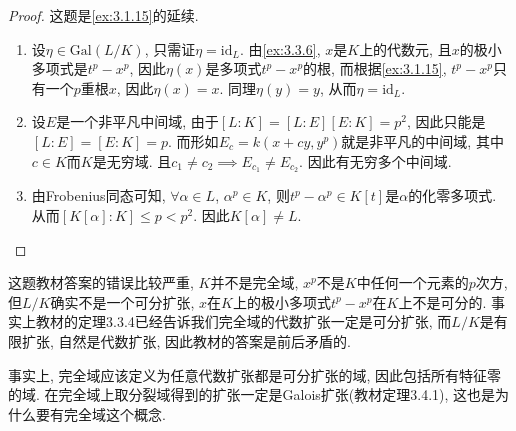 \begin{proof}
    这题是\ref{ex:3.1.15}的延续.
    \begin{enumerate}[(1)]
        \item 设$\eta \in \mathrm{Gal}(L/K)$, 只需证$\eta = \mathrm{id}_L$. 由\ref{ex:3.3.6}, $x$是$K$上的代数元, 且$x$的极小多项式是$t^p - x^p$, 因此$\eta(x)$是多项式$t^p - x^p$的根, 而根据\ref{ex:3.1.15}, $t^p - x^p$只有一个$p$重根$x$, 因此$\eta(x) = x$. 同理$\eta(y) = y$, 从而$\eta = \mathrm{id}_L$.
        \item 设$E$是一个非平凡中间域, 由于$[L:K] = [L:E][E:K] = p^2$, 因此只能是$[L:E] = [E:K] = p$. 而形如$E_c = k(x + cy, y^p)$就是非平凡的中间域, 其中$c \in K$而$K$是无穷域. 且$c_1 \neq c_2 \implies E_{c_1} \neq E_{c_2}$. 因此有无穷多个中间域.
        \item 由Frobenius同态可知, $\forall \alpha \in L$, $\alpha^p \in K$, 则$t^p - \alpha^p \in K[t]$是$\alpha$的化零多项式. 从而$[K[\alpha]:K] \leqslant p < p^2$. 因此$K[\alpha] \neq L$.
    \end{enumerate}
\end{proof}

\begin{remark}
    这题教材答案的错误比较严重, $K$并不是完全域, $x^p$不是$K$中任何一个元素的$p$次方, 但$L/K$确实不是一个可分扩张, $x$在$K$上的极小多项式$t^p - x^p$在$K$上不是可分的. 事实上教材的定理3.3.4已经告诉我们完全域的代数扩张一定是可分扩张, 而$L/K$是有限扩张, 自然是代数扩张, 因此教材的答案是前后矛盾的.

    事实上, 完全域应该定义为任意代数扩张都是可分扩张的域, 因此包括所有特征零的域. 在完全域上取分裂域得到的扩张一定是Galois扩张(教材定理3.4.1), 这也是为什么要有完全域这个概念.
\end{remark}
